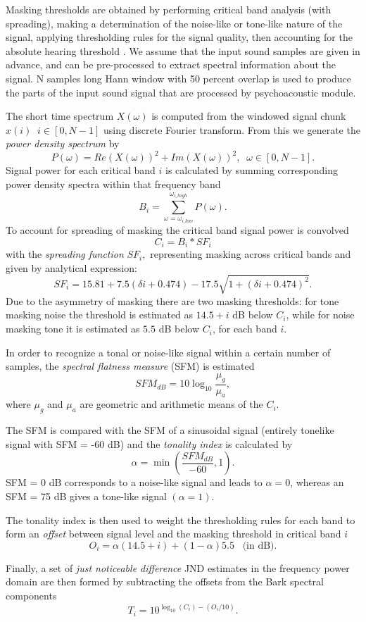 Masking thresholds are obtained by performing critical band analysis (with spreading), making a determination of the noise-like or tone-like nature of the signal, applying thresholding rules for the signal quality, then accounting for the absolute hearing threshold \cite{painter2000perceptual}. 
We assume that the input sound samples are given in advance, and can be pre-processed to extract spectral information about the signal. N samples long Hann window with 50 percent overlap is used to produce the parts of the input sound signal that are processed by psychoacoustic module.

The short time spectrum \( X(\omega) \) is computed from the windowed signal chunk \( x(i) \;\; i \in [0, N-1]\) using discrete Fourier transform. From this we generate the \emph{power density spectrum} by
\[ P(\omega) = Re(X(\omega))^2 + Im(X(\omega))^2, \;\; \omega \in [0, N-1]. \]
Signal power for each critical band \(i\) is calculated by summing corresponding power density spectra within that frequency band
\[ B_i = \sum_{\omega = \omega_{i\_low}}^{\omega_{i\_high}} P(\omega). \]
To account for spreading of masking the critical band signal power is convolved 
\[ C_i = B_i * SF_i \]
with the \emph{spreading function} \( SF_i, \) representing masking across critical bands and given by analytical expression:
\[ SF_i = 15.81 + 7.5(\delta i + 0.474) - 17.5\sqrt{1 + (\delta i + 0.474)^2} .\]
Due to the asymmetry of masking there are two masking thresholds: for tone masking noise the threshold is estimated as \( 14.5 + i\) dB below \( C_i \), while for noise masking tone it is estimated as \( 5.5 \) dB below \( C_i \), for each band \( i \). 

In order to recognize a tonal or noise-like signal within a certain number of samples, the \emph{spectral flatness measure} (SFM) is estimated
\[ SFM_{dB} = 10 \log_{10} \frac{\mu_g}{\mu_a}, \]
where \( \mu_g \) and \( \mu_a \) are geometric and arithmetic means of the \( C_i \).

The SFM is compared with the SFM of a sinusoidal signal (entirely tonelike signal with SFM = -60 dB)
and the \emph{tonality index} is calculated \cite{johnston1988estimation} by
\[ \alpha = \min (\frac{SFM_{dB}}{-60}, 1) .\]
SFM = 0 dB corresponds to a noise-like signal and leads to \( \alpha = 0 \), whereas an SFM = 75 dB gives a tone-like signal \( (\alpha = 1) \).

The tonality index is then used to weight the thresholding rules for each band to form an \emph{offset} between signal level and the masking threshold in critical band \( i \)
\[ O_i = \alpha(14.5 + i) + (1 - \alpha)5.5 \;\;\; \text{(in dB)}.\]

Finally, a set of \emph{just noticeable difference} JND estimates in the frequency power domain are then formed by subtracting the offsets from the Bark spectral components
\[ T_i = 10^{\log_{10}(C_i) - (O_i/10)} .\]
